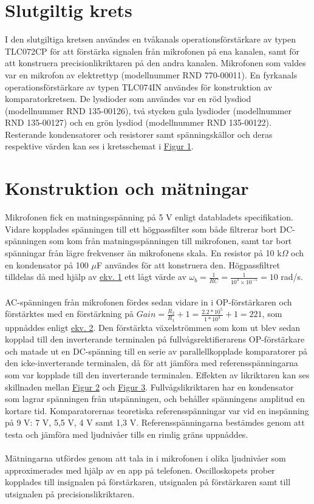 \documentclass[12pt]{report}
\begin{document}
\section{Slutgiltig krets}
\label{sec:final}
I den slutgiltiga kretsen användes en tvåkanals operationsförstärkare av typen \\TLC072CP för att förstärka signalen från mikrofonen på ena kanalen, samt för att konstruera precisionlikriktaren på den andra kanalen. Mikrofonen som valdes var en mikrofon av elektrettyp (modellnummer RND 770-00011). En fyrkanals operationsförstärkare av typen TLC074IN användes för konstruktion av komparatorkretsen. De lysdioder som användes var en röd lysdiod (modellnummer RND 135-00126), två stycken gula lysdioder (modellnummer RND 135-00127) och en grön lysdiod (modellnummer RND 135-00122). Resterande kondensatorer och resistorer samt spänningskällor och deras respektive värden kan ses i kretsschemat i \hyperref[fig:circuit]{Figur 1}.

\section{Konstruktion och mätningar}
\label{sec:construct}
Mikrofonen fick en matningsspänning på 5 V enligt databladets specifikation. Vidare kopplades spänningen till ett högpassfilter som både filtrerar bort DC-spänningen som kom från matningsspänningen till mikrofonen, samt tar bort spänningar från lägre frekvenser än mikrofonens skala. En resistor på 10 k$\Omega$ och en kondensator på 100 $\mu$F användes för att konstruera den. Högpassfiltret tilldelas då med hjälp av \hyperref[eq:wb]{ekv. 1} ett lågt värde av $\omega_b=\frac{1}{R C}=\frac{1}{10^4\times10^{-5}}=10$ rad/s.
\\\\
AC-spänningen från mikrofonen fördes sedan vidare in i OP-förstärkaren och förstärktes med en förstärkning på $Gain = \frac{R_2}{R_1}+1=\frac{2.2*10^5}{1*10^3}+1 = 221$, som uppnåddes enligt \hyperref[eq:gain]{ekv. 2}. Den förstärkta växelströmmen som kom ut blev sedan kopplad till den inverterande terminalen på fullvågsrektifierarens OP-förstärkare och matade ut en DC-spänning till en serie av parallellkopplade komparatorer på den icke-inverterande terminalen, då för att jämföra med referensspänningarna som var kopplade till den inverterande terminalen. Effekten av likriktaren kan ses skillnaden mellan \hyperref[fig:efterf]{Figur 2} och \hyperref[fig:lik]{Figur 3}. Fullvågslikriktaren har en kondensator som lagrar spänningen från utspänningen, och behåller spänningens amplitud en kortare tid. Komparatorernas teoretiska referensspänningar var vid en inspänning på 9 V:  7 V,  5,5 V, 4 V samt 1,3 V. Referensspänningarna bestämdes genom att testa och jämföra med ljudnivåer tills en rimlig gräns uppnåddes.
\\\\
Mätningarna utfördes genom att tala in i mikrofonen i olika ljudnivåer som approximerades med hjälp av en app på telefonen. Oscilloskopets prober kopplades till insignalen på förstärkaren, utsignalen på förstärkaren samt till utsignalen på precisionslikriktaren.
\end{document}
